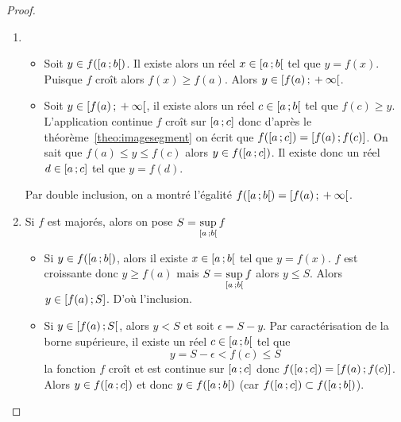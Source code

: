\begin{proof}
  \begin{enumerate}
    \item
      \begin{itemize}
        \item Soit \(y \in f(\left[ a \, ; {} b \right[)\). Il existe alors un réel \(x 
          \in \left[ a \, ; {} b \right[\) tel que \(y=f(x)\). Puisque \(f\) croît 
          alors \(f(x) \geqslant f(a)\). Alors \(y \in 
          \left[ f(a) \, ; {} +\infty \right[\).
        \item Soit \(y \in \left[ f(a) \, ; {} +\infty \right[\), il existe alors un 
          réel \(c \in \left[ a \, ; {} b \right[\) tel que \(f(c) \geqslant y\). 
          L'application continue \(f\) croît sur \(\left[ a \, ; {} c \right]\) donc 
          d'après le théorème~\ref{theo:imagesegment} on écrit que 
          \(f(\left[ a \, ; {} c \right])=\left[ f(a) \, ; {} f(c) \right]\). On sait que 
          \(f(a) \le y \leqslant f(c)\) alors \(y \in f(\left[ a \, ; {} c \right])\). 
          Il existe donc un réel \(d \in \left[ a \, ; {} c \right]\) tel que 
          \(y=f(d)\).
      \end{itemize}
      Par double inclusion, on a montré l'égalité 
      \(f(\left[ a \, ; {} b \right[)=\left[ f(a) \, ; {} +\infty \right[\).
    \item Si \(f\) est majorés, alors on pose 
      \(S=\sup\limits_{\left[ a \, ; {} b \right[}f\)
      \begin{itemize}
        \item Si \(y \in f(\left[ a \, ; {} b \right[)\), alors il existe \(x \in 
          \left[ a \, ; {} b \right[\) tel que \(y=f(x)\). \(f\) est croissante donc 
          \(y \geqslant f(a)\) mais \(S=\sup\limits_{\left[ a \, ; {} b \right[}f\) 
          alors \(y \leqslant S\). Alors \(y \in \left[ f(a) \, ; {} S \right]\). D'où 
          l'inclusion.
        \item Si \(y \in \left[ f(a) \, ; {} S \right[\), alors \(y < S\) et soit 
          \(\epsilon=S-y\). Par caractérisation de la borne supérieure, il 
          existe un réel \(c \in \left[ a \, ; {} b \right[\) tel que
          \begin{equation}
            y=S-\epsilon < f(c) \leqslant S
          \end{equation}
          la fonction \(f\) croît et est continue sur \(\left[ a \, ; {} c \right]\) 
          donc \(f(\left[ a \, ; {} c \right])=\left[ f(a) \, ; {} f(c) \right]\). Alors \(y 
          \in f(\left[ a \, ; {} c \right])\) et donc \(y \in f(\left[ a \, ; {} b \right[)\) 
          (car \(f(\left[ a \, ; {} c \right]) \subset f(\left[ a \, ; {} b \right[)\)).

\end{itemize}
\end{enumerate}
\end{proof}
